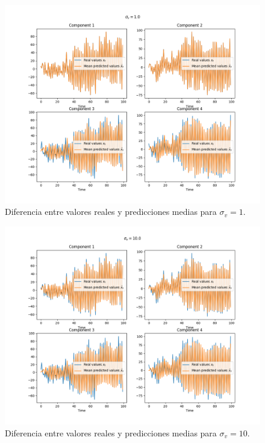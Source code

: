 \documentclass[11pt,a4paper]{article}
\begin{document}
\begin{figure}[h!]
    \centering
    \includegraphics[width=.87\textwidth]{img/components_s1}
    \caption{Diferencia entre valores reales y predicciones medias para $\sigma_v=1$.}
    \label{fig:comp1}
\end{figure}

\begin{figure}[h!]
    \centering
    \includegraphics[width=.87\textwidth]{img/components_s10}
    \caption{Diferencia entre valores reales y predicciones medias para $\sigma_v=10$.}
    \label{fig:comp2}
\end{figure}

\newpage
\end{document}
